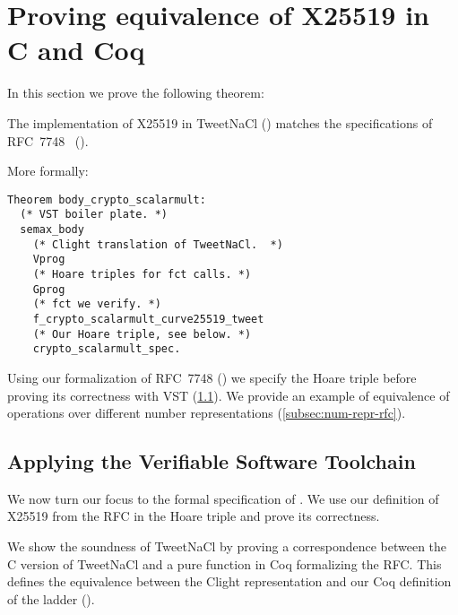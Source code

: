 \section{Proving equivalence of X25519 in C and Coq}
\label{sec:C-Coq}

In this section we prove the following theorem:

\begin{informaltheorem}
  The implementation of X25519 in TweetNaCl () matches
  the specifications of RFC~7748~\cite{rfc7748} ().
\end{informaltheorem}

More formally:
\begin{lstlisting}[language=Coq]
Theorem body_crypto_scalarmult:
  (* VST boiler plate. *)
  semax_body
    (* Clight translation of TweetNaCl.  *)
    Vprog
    (* Hoare triples for fct calls. *)
    Gprog
    (* fct we verify. *)
    f_crypto_scalarmult_curve25519_tweet
    (* Our Hoare triple, see below. *)
    crypto_scalarmult_spec.
\end{lstlisting}

Using our formalization of RFC~7748 () we specify the Hoare
triple before proving its correctness with VST (\ref{subsec:with-VST}).
We provide an example of equivalence of operations over different number
representations (\ref{subsec:num-repr-rfc}).


\subsection{Applying the Verifiable Software Toolchain}
\label{subsec:with-VST}

\begin{sloppypar}
      We now turn our focus to the formal specification of .
      We use our definition of X25519 from the RFC in the Hoare triple and prove
      its correctness.
\end{sloppypar}

We show the soundness of TweetNaCl by proving a correspondence between
the C version of TweetNaCl and a pure function in Coq formalizing the RFC.
This defines the equivalence between the Clight representation and our Coq
definition of the ladder ().

